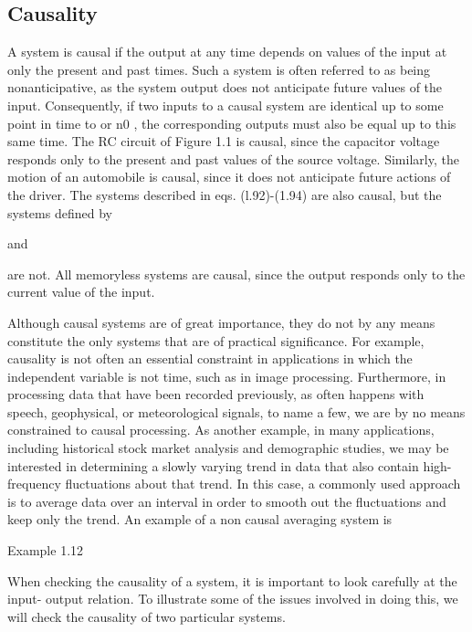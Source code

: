 \documentclass{report}
\begin{document}
\subsection*{Causality}

A system is causal if the output at any time depends on values of the input at only the present and past times. Such a system is often referred to
as being nonanticipative, as the system output does not anticipate future values of the input. Consequently, if two inputs to a causal system are
identical up to some point in time to or n0 , the corresponding outputs must also be equal up to this same time. The RC circuit of Figure 1.1 is
causal, since the capacitor voltage responds only to the present and past values of the source voltage. Similarly, the motion of an automobile is
causal, since it does not anticipate future actions of the driver. The systems described in eqs. (l.92)-(1.94) are also causal, but the systems defined
by



and



are not. All memoryless systems are causal, since the output responds only to the current value of the input.

Although causal systems are of great importance, they do not by any means constitute the only systems that are of practical significance. For example,
causality is not often an essential constraint in applications in which the independent variable is not time, such as in image processing. Furthermore,
in processing data that have been recorded previously, as often happens with speech, geophysical, or meteorological signals, to name a few, we are
by no means constrained to causal processing. As another example, in many applications, including historical stock market analysis and demographic
studies, we may be interested in determining a slowly varying trend in data that also contain high-frequency fluctuations about that trend. In this
case, a commonly used approach is to average data over an interval in order to smooth out the fluctuations and keep only the trend. An example of
a non causal averaging system is



Example 1.12

When checking the causality of a system, it is important to look carefully at the input- output relation. To illustrate some of the issues involved
in doing this, we will check the causality of two particular systems.
\end{document}
